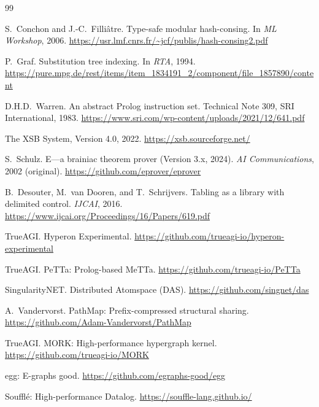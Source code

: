 \documentclass[11pt]{article}
\begin{document}
\begin{thebibliography}{99}

S.~Conchon and J.-C.~Filliâtre.
\newblock Type-safe modular hash-consing.
\newblock In \emph{ML Workshop}, 2006.
\newblock \url{https://usr.lmf.cnrs.fr/~jcf/publis/hash-consing2.pdf}

P.~Graf.
\newblock Substitution tree indexing.
\newblock In \emph{RTA}, 1994.
\newblock \url{https://pure.mpg.de/rest/items/item_1834191_2/component/file_1857890/content}

D.H.D.~Warren.
\newblock An abstract Prolog instruction set.
\newblock Technical Note 309, SRI International, 1983.
\newblock \url{https://www.sri.com/wp-content/uploads/2021/12/641.pdf}

The XSB System, Version 4.0, 2022.
\newblock \url{https://xsb.sourceforge.net/}

S.~Schulz.
\newblock E---a brainiac theorem prover (Version 3.x, 2024).
\newblock \emph{AI Communications}, 2002 (original).
\newblock \url{https://github.com/eprover/eprover}

B.~Desouter, M.~van Dooren, and T.~Schrijvers.
\newblock Tabling as a library with delimited control.
\newblock \emph{IJCAI}, 2016.
\newblock \url{https://www.ijcai.org/Proceedings/16/Papers/619.pdf}

TrueAGI.
\newblock Hyperon Experimental.
\newblock \url{https://github.com/trueagi-io/hyperon-experimental}

TrueAGI.
\newblock PeTTa: Prolog-based MeTTa.
\newblock \url{https://github.com/trueagi-io/PeTTa}

SingularityNET.
\newblock Distributed Atomspace (DAS).
\newblock \url{https://github.com/singnet/das}

A.~Vandervorst.
\newblock PathMap: Prefix-compressed structural sharing.
\newblock \url{https://github.com/Adam-Vandervorst/PathMap}

TrueAGI.
\newblock MORK: High-performance hypergraph kernel.
\newblock \url{https://github.com/trueagi-io/MORK}

egg: E-graphs good.
\newblock \url{https://github.com/egraphs-good/egg}

Soufflé: High-performance Datalog.
\newblock \url{https://souffle-lang.github.io/}


\end{thebibliography}
\end{document}
